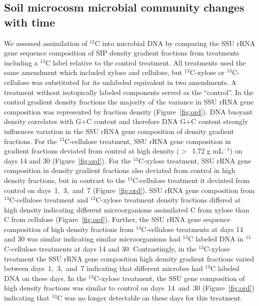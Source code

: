 \subsection{Soil microcosm microbial community changes with time}
We assessed assimilation of $^{13}$C into microbial DNA by comparing the SSU
rRNA gene sequence composition of SIP density gradient fractions from
treatments including a $^{13}$C label relative to the control treatment. All
treatments used the same amendment which included xylose and cellulose, but
$^{13}$C-xylose or $^{13}$C-cellulose was substituted for its unlabeled
equivalent in two amendments. A treatment without isotopically labeled
components served as the ``control''. In the control gradient density fractions
the majority of the variance in SSU rRNA gene composition was represented by
fraction density (Figure~\ref{fig:ord}). DNA buoyant density correlates with
G$+$C content \citep{Buckley_2007} and therefore DNA G$+$C content strongly influences
variation in the SSU rRNA gene composition of density gradient fractions. For
the $^{13}$C-cellulose treatment, SSU rRNA gene composition in gradient
fractions deviated from control at high density ($>$~1.72 g mL$^{-1}$) on days
14 and 30 (Figure~\ref{fig:ord}). For the $^{13}$C-xylose treatment, SSU rRNA
gene composition in density gradient fractions also deviated from control in
high density fractions, but in contrast to the $^{13}$C-cellulose treatment it
deviated from control on days~1,~3,~and~7 (Figure~\ref{fig:ord}). SSU rRNA gene
composition from $^{13}$C-cellulose treatment and $^{13}$C-xylose treatment
density fractions differed at high density indicating different microorganisms
assimilated C from xylose than C from cellulose
(Figure~\ref{fig:ord}). Further, the SSU rRNA gene sequence composition of high
density fractions from $^{13}$C-cellulose treatments at days 14 and 30 was
similar indicating similar microorganisms had $^{13}$C labeled DNA in
$^{13}$C-cellulose treatments at days 14 and 30. Contrastingly, in the
$^{13}$C-xylose treatment the SSU rRNA gene composition high density gradient
fractions varied between days~1,~3,~and~7 indicating that different microbes
had $^{13}$C labeled DNA on these days. In the $^{13}$C-xylose treatment, the
SSU gene composition of high density fractions was similar to control on
days~14~and~30 (Figure~\ref{fig:ord}) indicating that $^{13}$C was no longer
detectable on these days for this treatment. 


